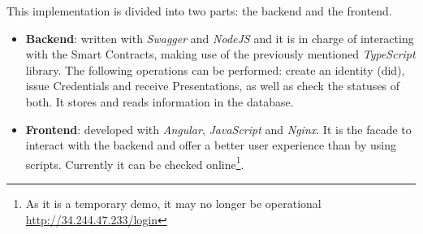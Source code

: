             This implementation is divided into two parts: the backend and the frontend.
            \begin{itemize}
                \item \textbf{Backend}: written with \textit{Swagger} and \textit{NodeJS} and it is in charge of interacting with the Smart Contracts, making use of the previously mentioned \textit{TypeScript} library. The following operations can be performed: create an identity (\acrshort{did}), issue Credentials and receive Presentations, as well as check the statuses of both. It stores and reads information in the database.
                \item \textbf{Frontend}: developed with \textit{Angular}, \textit{JavaScript} and \textit{Nginx}. It is the facade to interact with the backend and offer a better user experience than by using scripts. Currently it can be checked online\footnote{As it is a temporary demo, it may no longer be operational \url{http://34.244.47.233/login}}.
            \end{itemize}
\newpage
